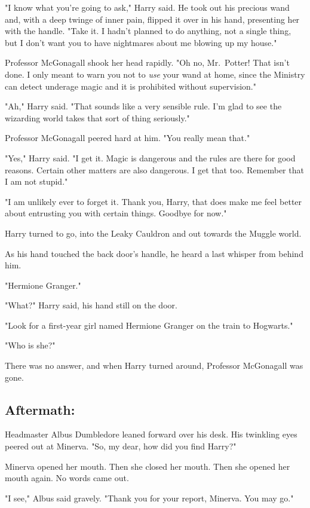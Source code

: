 "I know what you're going to ask," Harry said. He took out his precious wand 
and, with a deep twinge of inner pain, flipped it over in his hand, presenting 
her with the handle. "Take it. I hadn't planned to do anything, not a single 
thing, but I don't want you to have nightmares about me blowing up my house."

Professor McGonagall shook her head rapidly. "Oh no, Mr.~Potter! That isn't 
done. I only meant to warn you not to \emph{use} your wand at home, since the 
Ministry can detect underage magic and it is prohibited without supervision."

"Ah," Harry said. "That sounds like a very sensible rule. I'm glad to see the 
wizarding world takes that sort of thing seriously."

Professor McGonagall peered hard at him. "You really mean that."

"Yes," Harry said. "I get it. Magic is dangerous and the rules are there for 
good reasons. Certain other matters are also dangerous. I get that too. 
Remember that I am not stupid."

"I am unlikely ever to forget it. Thank you, Harry, that does make me feel 
better about entrusting you with certain things. Goodbye for now."

Harry turned to go, into the Leaky Cauldron and out towards the Muggle world.

As his hand touched the back door's handle, he heard a last whisper from behind 
him.

"Hermione Granger."

"What?" Harry said, his hand still on the door.

"Look for a first-year girl named Hermione Granger on the train to Hogwarts."

"Who is she?"

There was no answer, and when Harry turned around, Professor McGonagall was 
gone.
\sbreak
\subsection{Aftermath:}

Headmaster Albus Dumbledore leaned forward over his desk. His twinkling eyes 
peered out at Minerva. "So, my dear, how did you find Harry?"

Minerva opened her mouth. Then she closed her mouth. Then she opened her mouth 
again. No words came out.

"I see," Albus said gravely. "Thank you for your report, Minerva. You may go."
